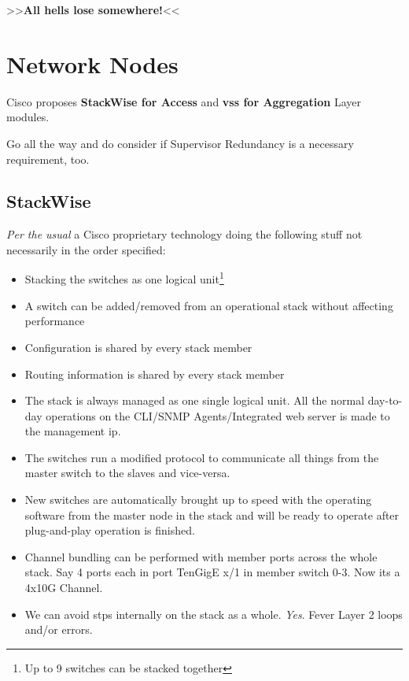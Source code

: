 \begin{center}
    \smallskip
    >>\hskip2mm\textbf{All hells lose somewhere!}\hskip2mm<<
\end{center}

\section{Network Nodes}

\begin{center}
    Cisco proposes \textbf{StackWise for Access} and \textbf{\gls{vss} for Aggregation} Layer modules.
\end{center}

Go all the way and do consider if Supervisor Redundancy is a necessary requirement, too.


\subsection{StackWise}

\textit{Per the usual} a Cisco proprietary technology doing the following stuff \footnotesize{not necessarily} in the order specified:
\begin{itemize}
    \item Stacking the switches as one logical unit\footnote{Up to 9 switches can be stacked together}
    \item A switch can be added/removed from an operational stack without affecting performance
    \item Configuration is shared by every stack member
    \item Routing information is shared by every stack member
    \item The stack is always managed as one single logical unit. All the normal day-to-day operations on the CLI/SNMP Agents/Integrated web server is made to the management \gls{ip}.
    \item The switches run a modified protocol to communicate all things from the master switch to the slaves and vice-versa.
    \item New switches are automatically brought up to speed with the operating software from the master node in the stack and will be ready to operate after plug-and-play operation is finished.
    \item Channel bundling can be performed with member ports across the whole stack. Say 4 ports each in port TenGigE x/1 in member switch 0-3. Now its a 4x10G Channel.
    \item We can avoid \glspl{stp} internally on the stack as a whole. \textit{Yes}. Fever Layer 2 loops and/or errors.
\end{itemize}

